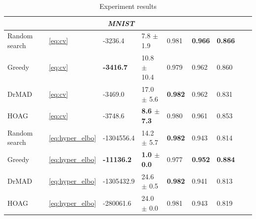 \begin{table}
\begin{tabularx}{\textwidth}{ |X|X|X|X|X|X|X|X|X|}
\multicolumn{7}{|c|}{\textit{MNIST}}  \\
\hline
Random search & ~\eqref{eq:cv} & -3236.4  & 7.8 $\pm$ 1.9  &   0.981 & \bf 0.966 & \bf 0.866 \\
\hline
Greedy & ~\eqref{eq:cv} & \bf -3416.7 & 10.8 $\pm$ 10.4 & 0.979 & 0.962 & 0.860\\
\hline
DrMAD & ~\eqref{eq:cv} & -3469.0 & 17.0 $\pm$ 5.6 & \bf  0.982 & 0.962 & 0.831\\
\hline
HOAG & ~\eqref{eq:cv} & -3748.6 & \bf 8.6 $\pm$ 7.3&   0.980 &  0.961  & 0.853 \\
\hline
Random search & ~\eqref{eq:hyper_elbo} & -1304556.4 &  14.2 $\pm$ 5.7 &  \bf 0.982 & 0.943 & 0.814 \\
\hline
Greedy & ~\eqref{eq:hyper_elbo} & \bf -11136.2 & \bf 1.0 $\pm$ 0.0  &  0.977 & \bf 0.952 & \bf 0.884\\
\hline
DrMAD & ~\eqref{eq:hyper_elbo} & -1305432.9 & 24.6 $\pm$ 0.5  & \bf 0.982 & 0.941 & 0.813 \\
\hline
HOAG & ~\eqref{eq:hyper_elbo} &  -280061.6 & 24.0 $\pm$ 0.0  & 0.981 & 0.943 & 0.819\\
\hline


\hline
\end{tabularx}
\caption{Experiment results}
\label{table:table}
\end{table}


